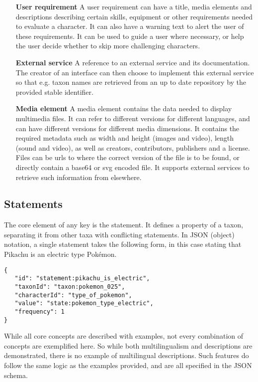 \documentclass[10pt,letterpaper]{article}
\begin{document}
\begin{itemize}
\item[\textbf{User requirement}]
A user requirement can have a title, media elements and descriptions describing certain skills, equipment or other requirements needed to evaluate a character. It can also have a warning text to alert the user of these requirements. It can be used to guide a user where necessary, or help the user decide whether to skip more challenging characters.
\item[\textbf{External service}]
A reference to an external service and its documentation. The creator of an interface can then choose to implement this external service so that e.g. taxon names are retrieved from an up to date repository by the provided stable identifier.
\item[\textbf{Media element}]
A media element contains the data needed to display multimedia files. It can refer to different versions for different languages, and can have different versions for different media dimensions. It contains the required metadata such as width and height (images and video), length (sound and video), as well as creators, contributors, publishers and a license. Files can be urls to where the correct version of the file is to be found, or directly contain a base64 or svg encoded file. It supports external services to retrieve such information from elsewhere.


\end{itemize}

\subsection*{
Statements
}

The core element of any key is the statement. It defines a property of a taxon, separating it from other taxa with conflicting statements. In JSON (object) notation, a single statement takes the following form, in this case stating that Pikachu is an electric type Pokémon.

\begin{verbatim}
{
   "id": "statement:pikachu_is_electric",
   "taxonId": "taxon:pokemon_025",
   "characterId": "type_of_pokemon",
   "value": "state:pokemon_type_electric",
   "frequency": 1
}

\end{verbatim}

While all core concepts are described with examples, not every combination of concepts are exemplified here. So while both multilingualism and descriptions are demonstrated, there is no example of multilingual descriptions. Such features do follow the same logic as the examples provided, and are all specified in the JSON schema.
\end{document}
